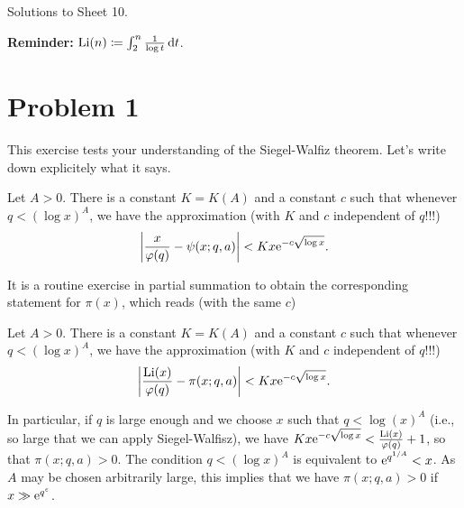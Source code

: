 \documentclass[a4paper,11pt]{article}
\author{Max von Consbruch}
\begin{document}
\begin{center}
    \huge{Solutions to Sheet 10.}
\end{center}

\textbf{Reminder:} $\mathrm{Li}(n) \coloneqq \int_2^n \frac 1{\log t} \mathrm{\,d} t$. 
\section*{Problem 1}
This exercise tests your understanding of the Siegel-Walfiz theorem.
Let's write down explicitely what it says. 
\begin{thm}
    Let $A>0$. There is a constant $K = K(A)$ and a constant $c$ such that
    whenever $q < (\log x)^A$, we have the approximation (with $K$ and $c$
    independent of $q$!!!)
    \[
        \left\lvert \frac{x}{\varphi(q)} - \psi(x; q, a) \right\rvert < K x \mathrm e^{-c \sqrt {\log x}}.
    \]
\end{thm}
It is a routine exercise in partial summation to obtain the corresponding 
statement for $\pi(x)$, which reads (with the same $c$)
\begin{thm}
    Let $A>0$. There is a constant $K = K(A)$ and a constant $c$ such that
    whenever $q < (\log x)^A$, we have the approximation (with $K$ and $c$
    independent of $q$!!!)
    \[
        \left\lvert \frac{\mathrm{Li}(x)}{\varphi(q)} - \pi(x; q, a) \right\rvert < K x \mathrm e^{-c \sqrt {\log x}}.
    \]
\end{thm}
In particular, if $q$ is large enough and we choose $x$ such that 
$q < \log(x)^A$ (i.e., so large that we can apply Siegel-Walfisz), 
we have $Kx\mathrm e^{-c \sqrt {\log x}} < \frac{\mathrm{Li}(x)}{\varphi(q)}+1$,
so that $\pi(x;q,a) > 0$. The condition $q < (\log x)^A$ is equivalent 
to $\mathrm e^{q^{1/A}} < x$. As $A$ may be chosen arbitrarily large, this 
implies that we have $\pi(x;q,a) > 0$ if $x \gg \mathrm e^{q^{\varepsilon}}$.
\end{document}

